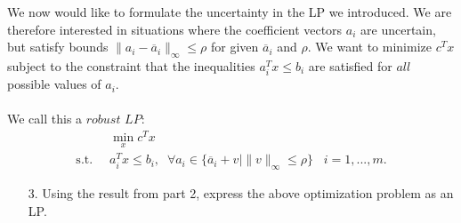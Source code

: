 \documentclass[11pt]{article}
\begin{document}
    We now would like to formulate the uncertainty in the LP we introduced. We are therefore interested in situations where the coefficient vectors $a_i$ are uncertain, but satisfy bounds $\|a_i - \overline{a}_i\|_{\infty} \leq \rho$  for given $\overline{a}_i$ and $\rho$. We want to minimize $c^Tx$ subject to the constraint that the inequalities $a_i^Tx \leq b_i$ are satisfied for $\textit{all}$ possible values of $a_i$. \\ \\
    We call this a $\textit{robust LP}:$
    \begin{align}
    &\min_x c^Tx \nonumber \\
    \label{RLP}
    \text{s.t.} \; \;  &a_i^Tx \leq b_i, \; \; \forall a_i \in \{ \overline{a}_i + v \mid \|v\|_{\infty} \leq \rho \} \; \; \; i = 1,...,m.
\end{align}

\begin{enumerate}
    \item[3.] Using the result from part 2, express the above optimization problem as an LP.

\end{enumerate}
\end{document}
